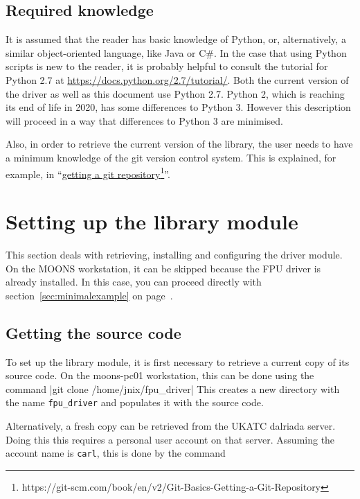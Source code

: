 \documentclass[11pt,a4paper]{scrartcl}
\begin{document}
\subsection{Required knowledge}

It is assumed that the reader has basic knowledge of Python, or,
alternatively, a similar object-oriented language, like Java or C\#.
In the case that using Python scripts is new to the reader, it is
probably helpful to consult the tutorial for Python 2.7 at
\url{https://docs.python.org/2.7/tutorial/}.  Both the current version
of the driver as well as this document use Python 2.7. Python 2, which
is reaching its end of life in 2020, has some differences to Python
3. However this description will proceed in a way that differences to
Python 3 are minimised.

Also, in order to retrieve the current version of the library, the
user needs to have a minimum knowledge of the git version control
system. This is explained, for example, in
``\href{https://git-scm.com/book/en/v2/Git-Basics-Getting-a-Git-Repository}{getting
  a git repository}\footnote{https://git-scm.com/book/en/v2/Git-Basics-Getting-a-Git-Repository}''.

\section{Setting up the library module}

This section deals with retrieving, installing and configuring the
driver module. On the MOONS workstation, it can be skipped because the
FPU driver is already installed.  In this case, you can proceed
directly with section~\ref{sec:minimalexample} on
page~\pageref{sec:minimalexample}.

\subsection{Getting the source code}

To set up the library module, it is first
necessary to retrieve a current copy of its source code.
On the moons-pc01 workstation, this can be done using the
command |git clone /home/jnix/fpu_driver|
This creates a new directory with the name \texttt{fpu\_driver}
and populates it with the source code.

Alternatively, a fresh copy can be retrieved from the UKATC dalriada
server. Doing this this requires a personal user account on that
server. Assuming the account name is \texttt{carl}, this is done by
the command
\end{document}
